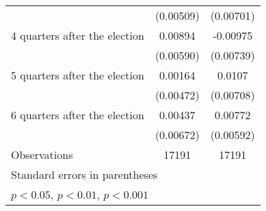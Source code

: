 \begin{table}[htbp]
\begin{tabular}{l*{2}{c}}
                    &   (0.00509)         &   (0.00701)         \\
[1em]
 4 quarters after the election&     0.00894         &    -0.00975         \\
                    &   (0.00590)         &   (0.00739)         \\
[1em]
 5 quarters after the election&     0.00164         &      0.0107         \\
                    &   (0.00472)         &   (0.00708)         \\
[1em]
 6 quarters after the election&     0.00437         &     0.00772         \\
                    &   (0.00672)         &   (0.00592)         \\
\hline
Observations        &       17191         &       17191         \\
\hline\hline
\multicolumn{3}{l}{\footnotesize Standard errors in parentheses}\\
\multicolumn{3}{l}{\footnotesize \sym{*} \(p<0.05\), \sym{**} \(p<0.01\), \sym{***} \(p<0.001\)}\\
\end{tabular}
\end{table}
